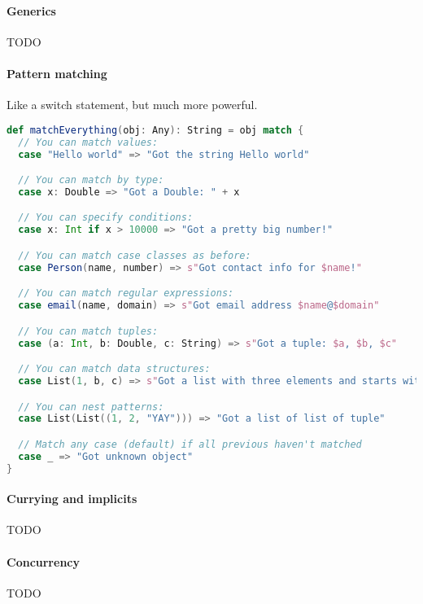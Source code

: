 \paragraph{Generics}
TODO

\paragraph{Pattern matching}
Like a switch statement, but much more powerful.
\begin{lstlisting}[language=scala, style=snippet]
def matchEverything(obj: Any): String = obj match {
  // You can match values:
  case "Hello world" => "Got the string Hello world"

  // You can match by type:
  case x: Double => "Got a Double: " + x

  // You can specify conditions:
  case x: Int if x > 10000 => "Got a pretty big number!"

  // You can match case classes as before:
  case Person(name, number) => s"Got contact info for $name!"

  // You can match regular expressions:
  case email(name, domain) => s"Got email address $name@$domain"

  // You can match tuples:
  case (a: Int, b: Double, c: String) => s"Got a tuple: $a, $b, $c"

  // You can match data structures:
  case List(1, b, c) => s"Got a list with three elements and starts with 1: 1, $b, $c"

  // You can nest patterns:
  case List(List((1, 2, "YAY"))) => "Got a list of list of tuple"

  // Match any case (default) if all previous haven't matched
  case _ => "Got unknown object"
}
\end{lstlisting}

\paragraph{Currying and implicits} TODO

\paragraph{Concurrency}
TODO